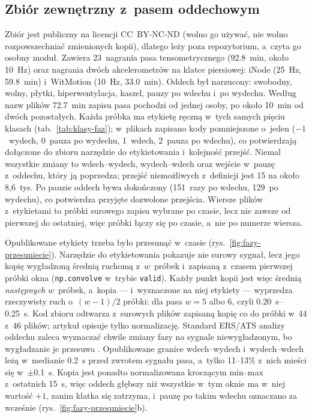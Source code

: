 \documentclass[12pt,a4paper,oneside]{report}
\begin{document}
\subsection{Zbiór zewnętrzny z~pasem oddechowym}
\label{sec:sieci-zbior-szymanski}
Zbiór \cite{szymanski2025} jest publiczny na licencji CC~BY-NC-ND (wolno go
używać, nie wolno rozpowszechniać zmienionych kopii), dlatego leży poza
repozytorium, a~czyta go osobny moduł. Zawiera 23~nagrania pasa
tensometrycznego (\SI{92.8}{min}, około \SI{10}{Hz}) oraz nagrania dwóch
akcelerometrów na klatce piersiowej: iNode (\SI{25}{Hz}, \SI{59.8}{min})
i~WitMotion (\SI{10}{Hz}, \SI{33.0}{min}). Oddech był narzucony: swobodny,
wolny, płytki, hiperwentylacja, kaszel, pauzy po wdechu i~po wydechu.
Według nazw plików \SI{72.7}{min} zapisu pasa pochodzi od jednej osoby, po
około \SI{10}{min} od dwóch pozostałych. Każda próbka ma etykietę ręczną w~tych samych pięciu
klasach (tab.~\ref{tab:klasy-faz}); w~plikach zapisano kody pomniejszone
o~jeden ($-1$~wydech, 0~pauza po wydechu, 1~wdech, 2~pauza po wdechu), co
potwierdzają dołączone do zbioru narzędzie do etykietowania i~kolejność
przejść. Niemal wszystkie zmiany to wdech--wydech, wydech--wdech oraz wejście
w~pauzę z~oddechu, który ją poprzedza; przejść niemożliwych z~definicji jest
15 na około 8,6~tys. Po pauzie oddech bywa dokończony (151~razy po wdechu,
129~po wydechu), co potwierdza przyjęte dozwolone przejścia. Wiersze plików
z~etykietami to próbki surowego zapisu wybrane po czasie, lecz nie zawsze od
pierwszej do ostatniej, więc próbki łączy się po czasie, a~nie po numerze
wiersza.

Opublikowane etykiety trzeba było przesunąć w~czasie
(rys.~\ref{fig:fazy-przesuniecie}). Narzędzie do etykietowania pokazuje nie
surowy sygnał, lecz jego kopię wygładzoną średnią ruchomą z~$w$~próbek
i~zapisaną z~czasem pierwszej próbki okna (\texttt{np.convolve} w~trybie
\texttt{valid}). Każdy punkt kopii jest więc średnią \emph{następnych}
$w$~próbek, a~kopia --- i~wyznaczone na niej etykiety --- wyprzedza
rzeczywisty ruch o~$(w-1)/2$ próbki: dla pasa $w=5$ albo 6, czyli
\SIrange{0.20}{0.25}{s}. Kod zbioru odtwarza z~surowych plików zapisaną kopię
co do próbki w~44 z~46 plików; artykuł opisuje tylko normalizację. Standard
ERS/ATS analizy oddechu zaleca wyznaczać chwile zmiany fazy na sygnale
niewygładzonym, bo wygładzanie je przesuwa \cite{bates2000}. Opublikowane
granice wdech--wydech i~wydech--wdech leżą w~medianie \SI{0.2}{s} przed
zwrotem sygnału pasa, a~tylko 11--13\% z~nich mieści się
w~$\pm$\SI{0.1}{s}. Kopia jest ponadto normalizowana kroczącym min--max
z~ostatnich \SI{15}{s}, więc oddech głębszy niż wszystkie w~tym oknie ma
w~niej wartość $+1$, zanim klatka się zatrzyma, i~pauzę po takim wdechu
oznaczano za wcześnie (rys.~\ref{fig:fazy-przesuniecie}b).
\end{document}
